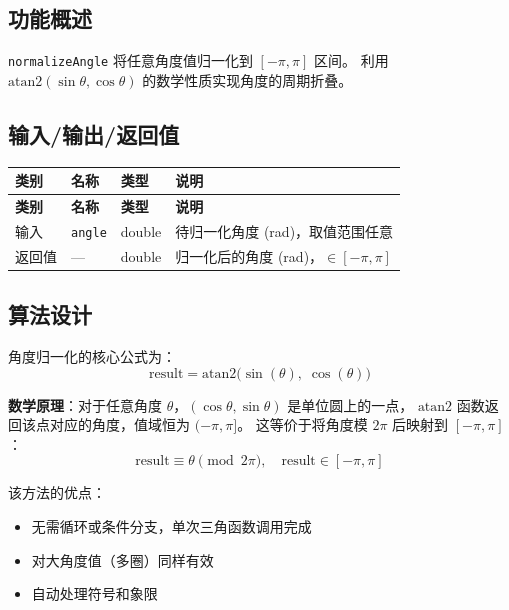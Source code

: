 \documentclass[a4paper,10pt]{article}
\begin{document}
\subsection{功能概述}

\texttt{normalizeAngle} 将任意角度值归一化到 $[-\pi, \pi]$ 区间。
利用 $\text{atan2}(\sin\theta, \cos\theta)$ 的数学性质实现角度的周期折叠。

\subsection{输入/输出/返回值}

\renewcommand{\arraystretch}{1.3}
\begin{longtable}{|C{1.5cm}|L{3.5cm}|C{2cm}|L{8cm}|}
\hline
\textbf{类别} & \textbf{名称} & \textbf{类型} & \textbf{说明} \\
\hline
\endfirsthead
\hline
\textbf{类别} & \textbf{名称} & \textbf{类型} & \textbf{说明} \\
\hline
\endhead
输入 & \texttt{angle} & double & 待归一化角度 (rad)，取值范围任意 \\
\hline
返回值 & --- & double & 归一化后的角度 (rad)，$\in [-\pi, \pi]$ \\
\hline
\end{longtable}

\subsection{算法设计}

角度归一化的核心公式为：
\begin{equation}
  \text{result} = \text{atan2}\!\big(\sin(\theta),\; \cos(\theta)\big)
\end{equation}

\textbf{数学原理}：对于任意角度 $\theta$，$(\cos\theta, \sin\theta)$ 是单位圆上的一点，
$\text{atan2}$ 函数返回该点对应的角度，值域恒为 $(-\pi, \pi]$。
这等价于将角度模 $2\pi$ 后映射到 $[-\pi, \pi]$：
\begin{equation}
  \text{result} \equiv \theta \pmod{2\pi}, \quad \text{result} \in [-\pi, \pi]
\end{equation}

该方法的优点：
\begin{itemize}
  \item 无需循环或条件分支，单次三角函数调用完成
  \item 对大角度值（多圈）同样有效
  \item 自动处理符号和象限
\end{itemize}
\end{document}
